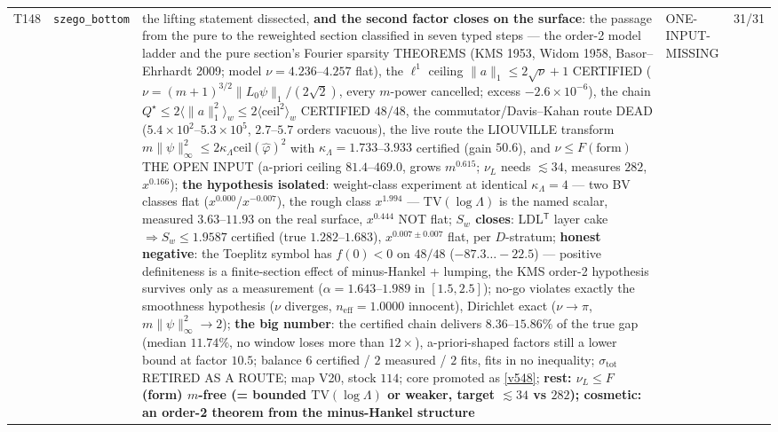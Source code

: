 \documentclass[11pt,a4paper]{article}
\begin{document}
{\begin{xltabular}{\linewidth}{@{}p{0.95cm} >{\raggedright\arraybackslash}p{3.1cm} Y >{\raggedright\scriptsize\arraybackslash}p{3.35cm} p{1.15cm}@{}}
T148 & \texttt{\scriptsize szego\_\allowbreak bottom} & the lifting statement dissected, \textbf{and the second factor closes on the surface}: the passage from the pure to the reweighted section classified in seven typed steps --- the order-2 model ladder and the pure section's Fourier sparsity THEOREMS (KMS 1953, Widom 1958, Basor--Ehrhardt 2009; model $\nu=4.236$--$4.257$ flat), the $\ell^1$ ceiling $\|a\|_1\le2\sqrt\nu+1$ CERTIFIED ($\nu=(m+1)^{3/2}\|L_0\psi\|_1/(2\sqrt2)$, every $m$-power cancelled; excess $-2.6\times10^{-6}$), the chain $Q^\star\le2\langle\|a\|_1^2\rangle_w\le2\langle\mathrm{ceil}^2\rangle_w$ CERTIFIED $48/48$, the commutator/Davis--Kahan route DEAD ($5.4\times10^{2}$--$5.3\times10^{5}$, $2.7$--$5.7$ orders vacuous), the live route the LIOUVILLE transform $m\|\psi\|_\infty^2\le2\kappa_\Lambda\mathrm{ceil}(\hat\varphi)^2$ with $\kappa_\Lambda=1.733$--$3.933$ certified (gain $50.6$), and $\nu\le F(\text{form})$ THE OPEN INPUT (a-priori ceiling $81.4$--$469.0$, grows $m^{0.615}$; $\nu_L$ needs $\lesssim34$, measures $282$, $x^{0.166}$); \textbf{the hypothesis isolated}: weight-class experiment at identical $\kappa_\Lambda=4$ --- two BV classes flat ($x^{0.000}$/$x^{-0.007}$), the rough class $x^{1.994}$ --- $\mathrm{TV}(\log\Lambda)$ is the named scalar, measured $3.63$--$11.93$ on the real surface, $x^{0.444}$ NOT flat; \textbf{$S_w$ closes}: LDL$^{\mathsf T}$ layer cake $\Rightarrow S_w\le1.9587$ certified (true $1.282$--$1.683$), $x^{0.007\pm0.007}$ flat, per $D$-stratum; \textbf{honest negative}: the Toeplitz symbol has $f(0)<0$ on $48/48$ ($-87.3\ldots-22.5$) --- positive definiteness is a finite-section effect of minus-Hankel + lumping, the KMS order-2 hypothesis survives only as a measurement ($\alpha=1.643$--$1.989$ in $[1.5,2.5]$); no-go violates exactly the smoothness hypothesis ($\nu$ diverges, $n_{\mathrm{eff}}=1.0000$ innocent), Dirichlet exact ($\nu\to\pi$, $m\|\psi\|_\infty^2\to2$); \textbf{the big number}: the certified chain delivers $8.36$--$15.86\%$ of the true gap (median $11.74\%$, no window loses more than $12\times$), a-priori-shaped factors still a lower bound at factor $10.5$; balance $6$ certified / $2$ measured / $2$ fits, fits in no inequality; $\sigma_{\mathrm{tot}}$ RETIRED AS A ROUTE; map V20, stock $114$; core promoted as \vref{v548}; \textbf{rest: $\nu_L\le F$(form) $m$-free (= bounded $\mathrm{TV}(\log\Lambda)$ or weaker, target $\lesssim34$ vs $282$); cosmetic: an order-2 theorem from the minus-Hankel structure} & ONE-INPUT-MISSING & 31/31\\

\end{xltabular}}
\end{document}
